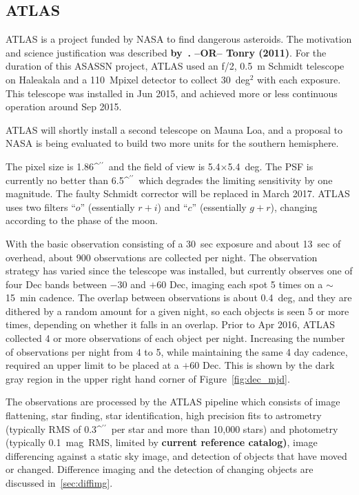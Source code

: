 \documentclass[aps,prb,twocolumn,superscriptaddress]{revtex4-1}
\def\arcsec{\ifmmode^{\prime\prime}\else$^{\prime\prime}$\fi}
\begin{document}
\subsection{ATLAS}
%
ATLAS is a project funded by NASA to find dangerous asteroids.  The
motivation and science justification was described 
{\bf by~\cite{ATLAS_data}. --OR--  Tonry (2011)}.
For the duration of this ASASSN project, ATLAS used an f/2, 0.5~m
Schmidt telescope on Haleakala and a 110~Mpixel detector to collect
30~deg$^2$ with each exposure.  This telescope was installed in Jun
2015, and achieved more or less continuous operation around Sep 2015.

ATLAS will shortly install a second telescope on Mauna Loa, and a
proposal to NASA is being evaluated to build two more units for the
southern hemisphere.

The pixel size is 1.86\arcsec\ and the field of view is
5.4$\times$5.4~deg.  The PSF is currently no better than 6.5\arcsec\
which degrades the limiting sensitivity by one magnitude.  The faulty
Schmidt corrector will be replaced in March 2017.  ATLAS uses two
filters ``$o$'' (essentially $r+i$) and ``$c$'' (essentially $g+r$),
changing according to the phase of the moon.

With the basic observation consisting of a 30~sec exposure and about 
13~sec of overhead, about 900 observations are collected per night.  
The observation strategy has varied since the telescope was
installed, but currently observes one of four Dec bands between $-30$%
and $+60$ Dec, imaging each spot 5 times on a $\sim$15~min cadence.
The overlap between observations is about 0.4~deg, and they are
dithered by a random amount for a given night, so each objects is seen
5 or more times, depending on whether it falls in an overlap.  
Prior to Apr 2016, ATLAS collected 4 or more observations of each object 
per night. Increasing the number of observations per night from 4 to 5, 
while maintaining the same 4 day cadence, required an upper limit to 
be placed at a $+60$ Dec. This is shown by the dark gray region in 
the upper right hand corner of Figure~\ref{fig:dec_mjd}.

The observations are processed by the ATLAS pipeline which consists of
image flattening, star finding, star identification, high precision
fits to astrometry (typically RMS of 0.3\arcsec\ per star and more
than 10,000 stars) and photometry (typically 0.1~mag~RMS, limited by
{\bf current reference catalog)}, image differencing against a static sky
image, and detection of objects that have moved or changed.  
Difference imaging and the detection of changing objects 
are discussed in~\cref{sec:diffimg}.
\end{document}
